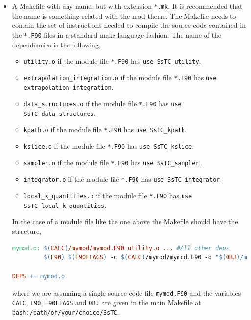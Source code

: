\documentclass[10pt,a4paper]{article}
\begin{document}
\begin{tcolorbox}
\begin{itemize}
\begin{codebox}{Module procedure header file}
\begin{lstlisting}[caption={Module procedure header file.},captionpos=b]
  public :: ...
\end{lstlisting}
\end{codebox}
will be the header file.
\item A Makefile with any name, but with extension \verb|*.mk|. It is recommended that the name is something related with the mod theme. The Makefile needs to contain the set of instructions needed to compile the source code contained in the \verb|*.F90| files in a standard make language fashion. The name of the dependencies is the following,
\begin{tcolorbox}
\begin{itemize}
\item \verb|utility.o| if the module file \verb|*.F90| has \verb|use SsTC_utility|.
\item \verb|extrapolation_integration.o| if the module file \verb|*.F90| has \verb|use extrapolation_integration|.
\item \verb|data_structures.o| if the module file \verb|*.F90| has \verb|use SsTC_data_structures|.
\item \verb|kpath.o| if the module file \verb|*.F90| has \verb|use SsTC_kpath|.
\item \verb|kslice.o| if the module file \verb|*.F90| has \verb|use SsTC_kslice|.
\item \verb|sampler.o| if the module file \verb|*.F90| has \verb|use SsTC_sampler|.
\item \verb|integrator.o| if the module file \verb|*.F90| has \verb|use SsTC_integrator|.
\item \verb|local_k_quantities.o| if the module file \verb|*.F90| has \verb|use SsTC_local_k_quantities|.
\end{itemize}
\end{tcolorbox}
In the case of a module file like the one above the Makefile should have the structure,
\begin{codebox}{}
\begin{lstlisting}[language=make, caption={Makefile.},captionpos=b]
mymod.o: $(CALC)/mymod/mymod.F90 utility.o ... #All other deps
         $(F90) $(F90FLAGS) -c $(CALC)/mymod/mymod.F90 -o "$(OBJ)/mymod.o"

DEPS += mymod.o
\end{lstlisting}
\end{codebox}
where we are assuming a single source code file \verb|mymod.F90| and the variables \verb|CALC|, \verb|F90|, \verb|F90FLAGS| and \verb|OBJ| are given in the main Makefile at \verb|bash:/path/of/your/choice/SsTC|.
\end{itemize}
\end{tcolorbox}
\end{document}
